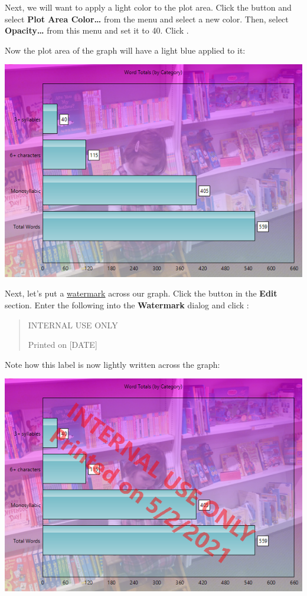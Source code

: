 \documentclass[
]{book}
\theoremstyle{definition}
\theoremstyle{definition}
\theoremstyle{definition}
\theoremstyle{definition}
\theoremstyle{remark}
\begin{document}
Next, we will want to apply a light color to the plot area. Click the  button and select \textbf{Plot Area Color\ldots{}} from the menu and select a new color. Then, select \textbf{Opacity\ldots{}} from this menu and set it to 40. Click .

Now the plot area of the graph will have a light blue applied to it:

\begin{center}\includegraphics[width=0.75\linewidth,]{Images/ExamplePlotBackgroundColorChanged} \end{center}

Next, let's put a \protect\hyperlink{watermark-and-logo}{watermark} across our graph. Click the  button in the \textbf{Edit} section. Enter the following into the \textbf{Watermark} dialog and click :

\begin{quote}
INTERNAL USE ONLY

Printed on {[}DATE{]}
\end{quote}

Note how this label is now lightly written across the graph:

\begin{center}\includegraphics[width=0.75\linewidth,]{Images/ExampleWatermarkChanged} \end{center}
\end{document}
